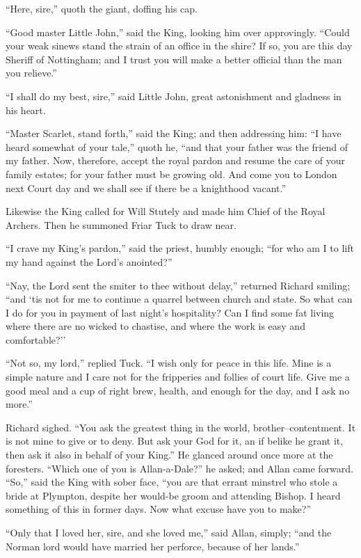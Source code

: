 ``Here, sire,'' quoth the giant, doffing his cap.

``Good master Little John,'' said the King, looking him over
approvingly. ``Could your weak sinews stand the strain of an office in
the shire? If so, you are this day Sheriff of Nottingham; and I trust
you will make a better official than the man you relieve.''

``I shall do my best, sire,'' said Little John, great astonishment and
gladness in his heart.

``Master Scarlet, stand forth,'' said the King; and then addressing him:
``I have heard somewhat of your tale,'' quoth he, ``and that your father
was the friend of my father. Now, therefore, accept the royal pardon and
resume the care of your family estates; for your father must be growing
old. And come you to London next Court day and we shall see if there be
a knighthood vacant.''

Likewise the King called for Will Stutely and made him Chief of the
Royal Archers. Then he summoned Friar Tuck to draw near.

``I crave my King's pardon,'' said the priest, humbly enough; ``for who
am I to lift my hand against the Lord's anointed?''

``Nay, the Lord sent the smiter to thee without delay,'' returned
Richard smiling; ``and `tis not for me to continue a quarrel between
church and state. So what can I do for you in payment of last night's
hospitality? Can I find some fat living where there are no wicked to
chastise, and where the work is easy and comfortable?''

``Not so, my lord,'' replied Tuck. ``I wish only for peace in this life.
Mine is a simple nature and I care not for the fripperies and follies of
court life. Give me a good meal and a cup of right brew, health, and
enough for the day, and I ask no more.''

Richard sighed. ``You ask the greatest thing in the world,
brother--contentment. It is not mine to give or to deny. But ask your
God for it, an if belike he grant it, then ask it also in behalf of your
King.'' He glanced around once more at the foresters. ``Which one of you
is Allan-a-Dale?'' he asked; and Allan came forward. ``So,'' said the
King with sober face, ``you are that errant minstrel who stole a bride
at Plympton, despite her would-be groom and attending Bishop. I heard
something of this in former days. Now what excuse have you to make?''

``Only that I loved her, sire, and she loved me,'' said Allan, simply;
``and the Norman lord would have married her perforce, because of her
lands.''

